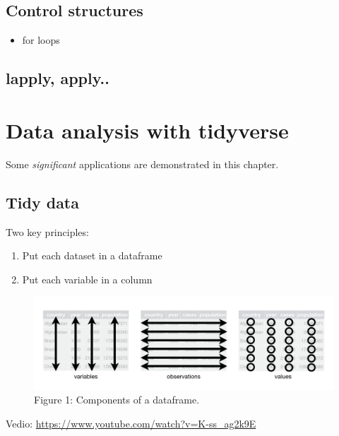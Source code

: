 \documentclass[
]{book}
\providecommand{\tightlist}{%
  \setlength{\itemsep}{0pt}\setlength{\parskip}{0pt}}
\begin{document}
\hypertarget{control-structures}{%
\section{Control structures}\label{control-structures}}

\begin{itemize}
\tightlist
\item
  for loops
\end{itemize}

\hypertarget{lapply-apply..}{%
\section{lapply, apply..}\label{lapply-apply..}}

\hypertarget{data-analysis-with-tidyverse}{%
\chapter{Data analysis with tidyverse}\label{data-analysis-with-tidyverse}}

Some \emph{significant} applications are demonstrated in this chapter.

\hypertarget{tidy-data}{%
\section{Tidy data}\label{tidy-data}}

Two key principles:

\begin{enumerate}
\def\labelenumi{\arabic{enumi}.}
\item
  Put each dataset in a dataframe
\item
  Put each variable in a column
\end{enumerate}

\begin{figure}
\centering
\includegraphics{tidy-1.png}
\caption{Figure 1: Components of a dataframe.}
\end{figure}

Vedio: \url{https://www.youtube.com/watch?v=K-ss_ag2k9E}
\end{document}
